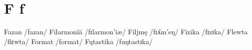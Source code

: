 \chapter{F f}
Fazan /fazan/ 
Filarmonïä /fɪlarmon’iæ/ 
Filjmę /fɪʎm’eŋ/ 
Fizika /fɪzɪka/ 
Flewta /flɛwta/ 
Format /format/ 
Fųtastika /fuŋtastɪka/